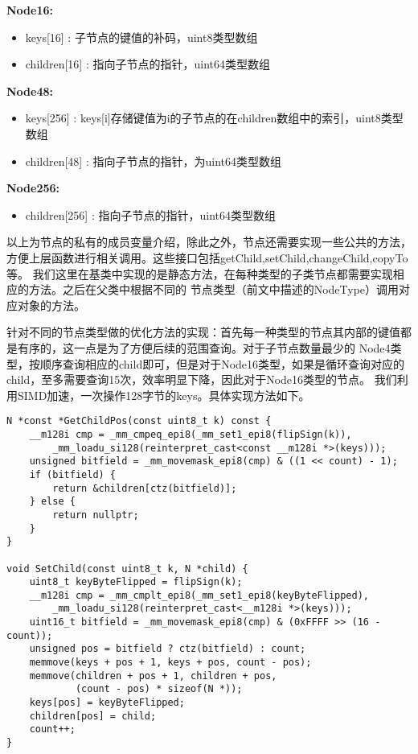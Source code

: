 \textbf{Node16:}
\begin{itemize}
\item keys[16] : 子节点的键值的补码，uint8类型数组

\item children[16] : 指向子节点的指针，uint64类型数组
\end{itemize}

\textbf{Node48:}
\begin{itemize}
\item keys[256] : keys[i]存储键值为i的子节点的在children数组中的索引，uint8类型数组

\item children[48] : 指向子节点的指针，为uint64类型数组
\end{itemize}

\textbf{Node256:}
\begin{itemize}
\item children[256] : 指向子节点的指针，uint64类型数组
\end{itemize}

以上为节点的私有的成员变量介绍，除此之外，节点还需要实现一些公共的方法，方便上层函数进行相关调用。这些接口包括getChild,setChild,changeChild,copyTo等。 
我们这里在基类中实现的是静态方法，在每种类型的子类节点都需要实现相应的方法。之后在父类中根据不同的
节点类型（前文中描述的NodeType）调用对应对象的方法。

针对不同的节点类型做的优化方法的实现：首先每一种类型的节点其内部的键值都是有序的，这一点是为了方便后续的范围查询。对于子节点数量最少的
Node4类型，按顺序查询相应的child即可，但是对于Node16类型，如果是循环查询对应的child，至多需要查询15次，效率明显下降，因此对于Node16类型的节点。
我们利用SIMD加速，一次操作128字节的keys。具体实现方法如下。

\begin{lstlisting} 
N *const *GetChildPos(const uint8_t k) const {
    __m128i cmp = _mm_cmpeq_epi8(_mm_set1_epi8(flipSign(k)),
        _mm_loadu_si128(reinterpret_cast<const __m128i *>(keys)));
    unsigned bitfield = _mm_movemask_epi8(cmp) & ((1 << count) - 1);
    if (bitfield) {
        return &children[ctz(bitfield)];
    } else {
        return nullptr;
    }
}

void SetChild(const uint8_t k, N *child) {
    uint8_t keyByteFlipped = flipSign(k);
    __m128i cmp = _mm_cmplt_epi8(_mm_set1_epi8(keyByteFlipped),
        _mm_loadu_si128(reinterpret_cast<__m128i *>(keys)));
    uint16_t bitfield = _mm_movemask_epi8(cmp) & (0xFFFF >> (16 - count));
    unsigned pos = bitfield ? ctz(bitfield) : count;
    memmove(keys + pos + 1, keys + pos, count - pos);
    memmove(children + pos + 1, children + pos, 
            (count - pos) * sizeof(N *));
    keys[pos] = keyByteFlipped;
    children[pos] = child;
    count++;
}
\end{lstlisting}

